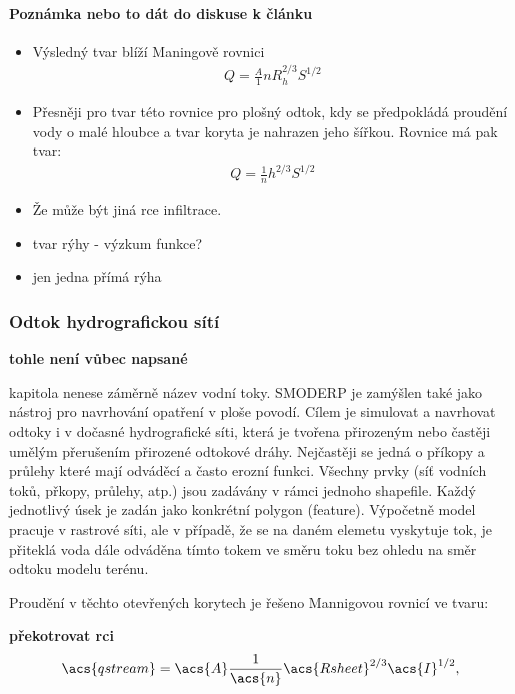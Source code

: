\paragraph{Poznámka nebo to dát do diskuse k článku} 
\begin{itemize}
\item Výsledný tvar blíží Maningově rovnici
\begin{eqnarray}
Q =\frac A {1}{n} R_{h}^{2/3} S^{1/2}
\end{eqnarray}
\item Přesněji pro tvar této rovnice pro plošný odtok, kdy se předpokládá proudění vody  o malé hloubce a tvar koryta je nahrazen jeho šířkou. Rovnice má pak tvar:
\begin{eqnarray}
Q =\frac {1}{n} h^{2/3} S^{1/2}
\end{eqnarray}
\item Že může být jiná rce infiltrace.
\item tvar rýhy - výzkum funkce?
\item jen jedna přímá rýha
\end{itemize}

\subsubsection{Odtok hydrografickou sítí} \label{sec:tokyodtok}
\textbf{tohle není vůbec napsané}

kapitola nenese záměrně název vodní toky. SMODERP je zamýšlen také jako nástroj pro navrhování opatření v ploše povodí. Cílem je simulovat a navrhovat odtoky i v dočasné hydrografické síti, která je tvořena přirozeným nebo častěji umělým přerušením přirozené odtokové dráhy. Nejčastěji se jedná o příkopy a průlehy které mají odváděcí a často erozní funkci. 
Všechny prvky (síť vodních toků, přkopy, průlehy, atp.) jsou zadávány v rámci jednoho shapefile. Každý jednotlivý úsek je zadán jako konkrétní polygon (feature). Výpočetně model pracuje v rastrové síti, ale v případě, že se na daném elemetu vyskytuje tok, je přiteklá voda dále odváděna tímto tokem ve směru toku bez ohledu na směr odtoku modelu terénu.

Proudění v těchto otevřených korytech je řešeno Mannigovou rovnicí ve tvaru:

\textbf{překotrovat rci}
\begin{equation}
    \acs{qstream} = \acs{A} \frac{1}{\acs{n}} \acs{Rsheet}^{2/3} \acs{I}^{1/2}  ,
    \label{eq:qtok}
\end{equation}

